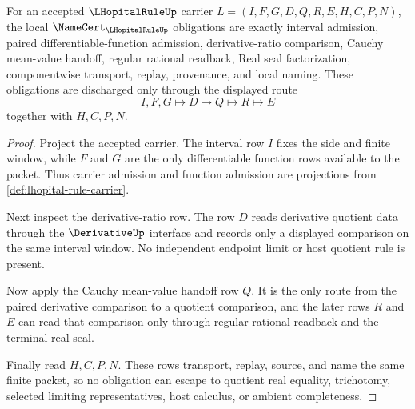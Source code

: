 \begin{theorem}
\label{thm:lhopital-rule-namecert-obligations}
For an accepted $\LHopitalRuleUp$ carrier $L=(I,F,G,D,Q,R,E,H,C,P,N)$, the local $\NameCert_{\LHopitalRuleUp}$ obligations are exactly interval admission, paired differentiable-function admission, derivative-ratio comparison, Cauchy mean-value handoff, regular rational readback, Real seal factorization, componentwise transport, replay, provenance, and local naming. These obligations are discharged only through the displayed route
$$
I,F,G\longmapsto D\longmapsto Q\longmapsto R\longmapsto E
$$
together with $H,C,P,N$.
\end{theorem}
\begin{proof}
Project the accepted carrier. The interval row $I$ fixes the side and finite window, while $F$ and $G$ are the only differentiable function rows available to the packet. Thus carrier admission and function admission are projections from \autoref{def:lhopital-rule-carrier}.

Next inspect the derivative-ratio row. The row $D$ reads derivative quotient data through the $\DerivativeUp$ interface and records only a displayed comparison on the same interval window. No independent endpoint limit or host quotient rule is present.

Now apply the Cauchy mean-value handoff row $Q$. It is the only route from the paired derivative comparison to a quotient comparison, and the later rows $R$ and $E$ can read that comparison only through regular rational readback and the terminal real seal.

Finally read $H,C,P,N$. These rows transport, replay, source, and name the same finite packet, so no obligation can escape to quotient real equality, trichotomy, selected limiting representatives, host calculus, or ambient completeness.
\end{proof}

